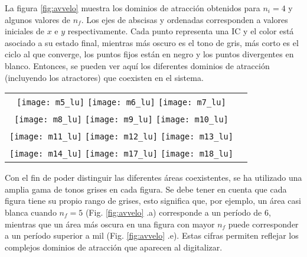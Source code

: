 La figura \ref{fig:avvelo} muestra los dominios de atracción obtenidos para $n_i = 4$ y algunos valores de $n_f$.
Los ejes de abscisas y ordenadas corresponden a valores iniciales de $x$ e $y$ respectivamente.
Cada punto representa una IC y el color está asociado a su estado final, mientras más oscuro es el tono de gris, más corto es el ciclo al que converge, los puntos fijos están en negro y los puntos divergentes en blanco.
Entonces, se pueden ver aquí los diferentes dominios de atracción (incluyendo los atractores) que coexisten en el sistema.
%
\begin{figure*}
  \centering
\begin{tabular}{cc}
\texttt{[image: m5\_lu]}
\texttt{[image: m6\_lu]}
\texttt{[image: m7\_lu]}\\
\texttt{[image: m8\_lu]}
\texttt{[image: m9\_lu]}
\texttt{[image: m10\_lu]}\\
\texttt{[image: m11\_lu]}
\texttt{[image: m12\_lu]}
\texttt{[image: m13\_lu]}\\
\texttt{[image: m14\_lu]}
\texttt{[image: m17\_lu]}
\texttt{[image: m18\_lu]}\\
\end{tabular}
\caption{Áreas coexistentes en el dominio de atracción para: (a) $n_f=5$, (b) $n_f=6$, (c) $n_f=7$, (d) $n_f=8$, (e) $n_f=9$, (f) $n_f=10$, (g) $n_f=11$, (h) $n_f=12$, (i) $n_f=13$, (j) $n_f=14$, (k) $n_f=17$, (l) $n_f=18$.}
\label{fig:avvelo}
\end{figure*}

Con el fin de poder distinguir las diferentes áreas coexistentes, se ha utilizado una amplia gama de tonos grises en cada figura.
Se debe tener en cuenta que cada figura tiene su propio rango de grises, esto significa que, por ejemplo, un área casi blanca cuando $n_f = 5$ (Fig. \ref{fig:avvelo} .a) corresponde a un período de $6$, mientras que un área más oscura en una figura con mayor $n_f$ puede corresponder a un período superior a mil (Fig. \ref{fig:avvelo} .e).
Estas cifras permiten reflejar los complejos dominios de atracción que aparecen al digitalizar.

